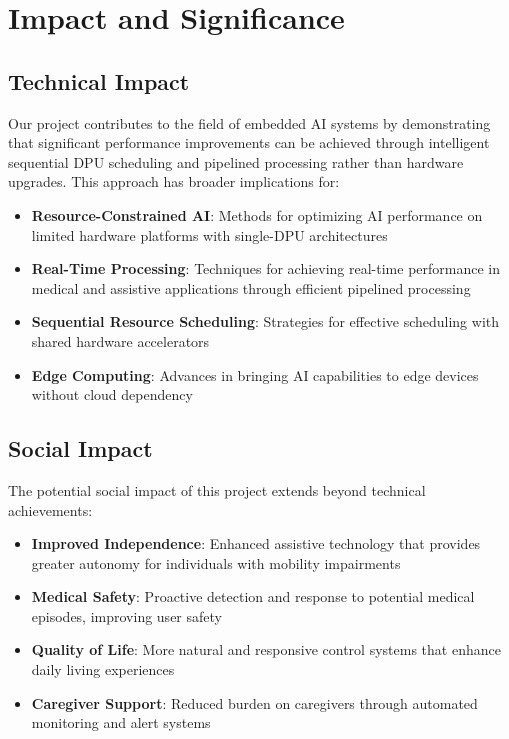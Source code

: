 \section{Impact and Significance}\label{sec:impact-significance}

\subsection{Technical Impact}\label{subsec:technical-impact}

Our project contributes to the field of embedded AI systems by demonstrating that significant performance improvements can be achieved through intelligent sequential DPU scheduling and pipelined processing rather than hardware upgrades. This approach has broader implications for:

\begin{itemize}
\item \textbf{Resource-Constrained AI}: Methods for optimizing AI performance on limited hardware platforms with single-DPU architectures
\item \textbf{Real-Time Processing}: Techniques for achieving real-time performance in medical and assistive applications through efficient pipelined processing
\item \textbf{Sequential Resource Scheduling}: Strategies for effective scheduling with shared hardware accelerators
\item \textbf{Edge Computing}: Advances in bringing AI capabilities to edge devices without cloud dependency
\end{itemize}

\subsection{Social Impact}\label{subsec:social-impact}

The potential social impact of this project extends beyond technical achievements:

\begin{itemize}
\item \textbf{Improved Independence}: Enhanced assistive technology that provides greater autonomy for individuals with mobility impairments~\cite{beauchamp2007ethics}
\item \textbf{Medical Safety}: Proactive detection and response to potential medical episodes, improving user safety
\item \textbf{Quality of Life}: More natural and responsive control systems that enhance daily living experiences
\item \textbf{Caregiver Support}: Reduced burden on caregivers through automated monitoring and alert systems
\end{itemize}

